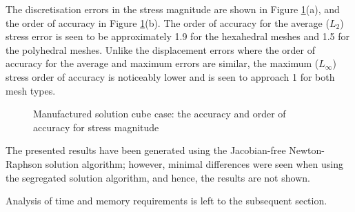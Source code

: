 \documentclass[sn-mathphys,Numbered]{sn-jnl}%
\begin{document}
The discretisation errors in the stress magnitude are shown in Figure \ref{fig:mms_stress_accuracy}(a), and the order of accuracy in Figure \ref{fig:mms_stress_accuracy}(b).
The order of accuracy for the average ($L_2$) stress error is seen to be approximately 1.9 for the hexahedral meshes and 1.5 for the polyhedral meshes.
Unlike the displacement errors where the order of accuracy for the average and maximum errors are similar, the maximum ($L_\infty$) stress order of accuracy is noticeably lower and is seen to approach 1 for both mesh types.
\begin{figure}[htbp]
	\centering
	\caption{Manufactured solution cube case: the accuracy and order of accuracy for stress magnitude}
	\label{fig:mms_stress_accuracy}
\end{figure}

The presented results have been generated using the Jacobian-free Newton-Raphson solution algorithm; however, minimal differences were seen when using the segregated solution algorithm, and hence, the results are not shown.

Analysis of time and memory requirements is left to the subsequent section.


\end{document}
